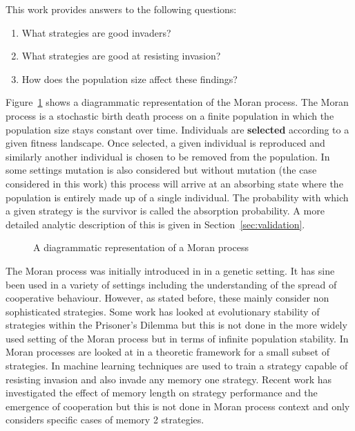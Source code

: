\documentclass{article}
\begin{document}
This work provides answers to the following questions:

\begin{enumerate}
    \item What strategies are good invaders?
    \item What strategies are good at resisting invasion?
    \item How does the population size affect these findings?
\end{enumerate}

Figure~\ref{fig:moran_process} shows a diagrammatic representation of the Moran
process. The Moran process is a stochastic birth death process on a finite
population in which the population size stays constant over time. Individuals
are \textbf{selected} according to a given fitness landscape. Once selected, a
given individual is reproduced and similarly another individual is chosen to be
removed from the population. In some settings mutation is also considered but
without mutation (the case considered in this work) this process will arrive at
an absorbing state where the population is entirely made up of a single
individual. The probability with which a given strategy is the survivor is
called the absorption probability. A more detailed analytic description of this
is given in Section~\ref{sec:validation}.

\begin{figure}[!hbtp]
    \centering
    
    \caption{A diagrammatic representation of a Moran process}
    \label{fig:moran_process}
\end{figure}

The Moran process was initially introduced in \cite{Moran1957} in a genetic
setting. It has sine been used in a variety of settings including the
understanding of the spread of cooperative behaviour. However, as stated before,
these mainly consider non sophisticated strategies. Some work has looked at
evolutionary stability of strategies within the Prisoner's Dilemma \cite{Li2014}
but this is not done in the more widely used setting of the Moran process but in
terms of infinite population stability. In \cite{Baek2016} Moran processes are
looked at in a theoretic framework for a small subset of strategies. In
\cite{Lee2015} machine learning techniques are used to train a strategy capable
of resisting invasion and also invade any memory one strategy. Recent work
\cite{Hilbe2017} has investigated the effect of memory length on strategy
performance and the emergence of cooperation but this is not done in Moran
process context and only considers specific cases of memory 2 strategies.
\end{document}
